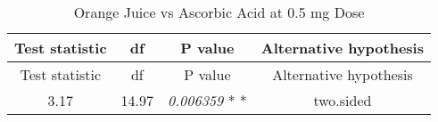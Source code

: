 \documentclass[]{article}
\begin{document}
\begin{longtable}[c]{@{}cccc@{}}
\caption{Orange Juice vs Ascorbic Acid at 0.5 mg Dose}\tabularnewline
\toprule
\begin{minipage}[b]{0.21\columnwidth}\centering\strut
Test statistic
\strut\end{minipage} &
\begin{minipage}[b]{0.07\columnwidth}\centering\strut
df
\strut\end{minipage} &
\begin{minipage}[b]{0.18\columnwidth}\centering\strut
P value
\strut\end{minipage} &
\begin{minipage}[b]{0.30\columnwidth}\centering\strut
Alternative hypothesis
\strut\end{minipage}\tabularnewline
\midrule
\endfirsthead
\toprule
\begin{minipage}[b]{0.21\columnwidth}\centering\strut
Test statistic
\strut\end{minipage} &
\begin{minipage}[b]{0.07\columnwidth}\centering\strut
df
\strut\end{minipage} &
\begin{minipage}[b]{0.18\columnwidth}\centering\strut
P value
\strut\end{minipage} &
\begin{minipage}[b]{0.30\columnwidth}\centering\strut
Alternative hypothesis
\strut\end{minipage}\tabularnewline
\midrule
\endhead
\begin{minipage}[t]{0.21\columnwidth}\centering\strut
3.17
\strut\end{minipage} &
\begin{minipage}[t]{0.07\columnwidth}\centering\strut
14.97
\strut\end{minipage} &
\begin{minipage}[t]{0.18\columnwidth}\centering\strut
\emph{0.006359} * *
\strut\end{minipage} &
\begin{minipage}[t]{0.30\columnwidth}\centering\strut
two.sided
\strut\end{minipage}\tabularnewline
\bottomrule
\end{longtable}
\end{document}
